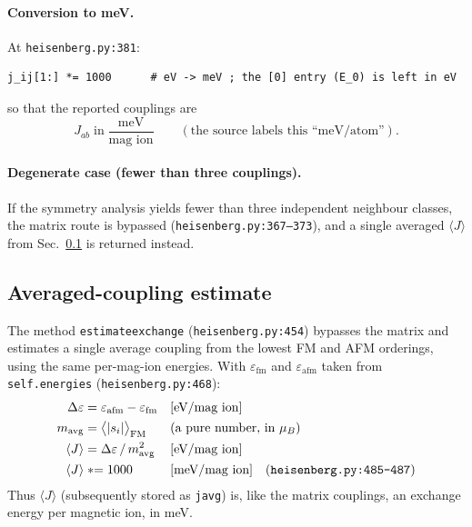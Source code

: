 \documentclass[11pt]{article}
\newcommand{\code}[1]{\texttt{\def\_{\textunderscore\allowbreak}#1}}
\begin{document}
\paragraph{Conversion to meV.} At \code{heisenberg.py:381}:
\begin{lstlisting}
j_ij[1:] *= 1000      # eV -> meV ; the [0] entry (E_0) is left in eV
\end{lstlisting}
so that the reported couplings are
\begin{equation}
  J_{ab} \;\text{in}\; \frac{\text{meV}}{\text{mag ion}}
  \qquad (\text{the source labels this ``meV/atom''}).
\end{equation}

\paragraph{Degenerate case (fewer than three couplings).} If the symmetry
analysis yields fewer than three independent neighbour classes, the matrix route
is bypassed (\code{heisenberg.py:367--373}), and a single averaged
$\langle J\rangle$ from Sec.~\ref{sec:javg} is returned instead.

\subsection{Averaged-coupling estimate}
\label{sec:javg}

The method \code{estimate\_exchange} (\code{heisenberg.py:454}) bypasses the matrix
and estimates a single average coupling from the lowest FM and AFM orderings,
using the same per-mag-ion energies. With $\varepsilon_{\mathrm{fm}}$ and
$\varepsilon_{\mathrm{afm}}$ taken from \code{self.energies}
(\code{heisenberg.py:468}):
\begin{align}
  \Delta\varepsilon &= \varepsilon_{\mathrm{afm}} - \varepsilon_{\mathrm{fm}}
    & & [\text{eV} / \text{mag ion}] \\
  m_{\mathrm{avg}} &= \big\langle |s_i| \big\rangle_{\mathrm{FM}}
    & & (\text{a pure number, in } \mu_B) \\
  \langle J\rangle &= \Delta\varepsilon \,/\, m_{\mathrm{avg}}^2
    & & [\text{eV} / \text{mag ion}] \\
  \langle J\rangle &\mathrel{*}= 1000
    & & [\text{meV} / \text{mag ion}]
    \quad (\code{heisenberg.py:485--487})
\end{align}
Thus $\langle J\rangle$ (subsequently stored as \code{javg}) is, like the matrix
couplings, an exchange energy per magnetic ion, in meV.
\end{document}
